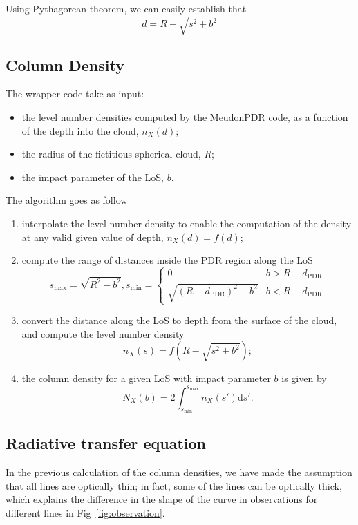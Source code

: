 \documentclass[12pt,a4paper]{article}
\newcommand{\mr}{\mathrm}
\newcommand{\dd}[1]{\mathrm{d}#1}
\begin{document}
Using Pythagorean theorem, we can easily establish that
\begin{equation}
    d = R - \sqrt{s^2 + b^2} 
\end{equation}

\subsection{Column Density}

The wrapper code take as input:
\begin{itemize}
    \item the level number densities computed by the MeudonPDR code, as a function of the depth into the cloud, $n_X(d)$;
    \item the radius of the fictitious spherical cloud, $R$;
    \item the impact parameter of the LoS, $b$.
\end{itemize}
The algorithm goes as follow
\begin{enumerate}
    \item interpolate the level number density to enable the computation of the density at any valid given value of depth, $n_X(d) = f(d)$;
    \item compute the range of distances inside the PDR region along the LoS
    \begin{equation}
         s_{\max} = \sqrt{R^2 - b^2}, 
         s_{\min} = \left\{\begin{array}{ll}
            0  &  b > R - d_\mr{PDR} \\
            \sqrt{(R - d_\mr{PDR})^2 - b^2}  &  b < R - d_\mr{PDR}
         \end{array}\right.
    \end{equation}
    \item convert the distance along the LoS to depth from the surface of the cloud, and compute the level number density
    \begin{equation}
        n_X(s) = f(R - \sqrt{s^2 + b^2});
    \end{equation}
    \item the column density for a given LoS with impact parameter $b$ is given by
    \begin{equation}
        N_X(b) = 2\int_{s_{\min}}^{s_{\max}} n_X(s') \dd{s'}.
    \end{equation}
\end{enumerate}

\subsection{Radiative transfer equation}
In the previous calculation of the column densities, we have made the assumption that all lines are optically thin; in fact, some of the lines can be optically thick, which explains the difference in the shape of the curve in observations for different lines in Fig~\ref{fig:observation}.
\end{document}
